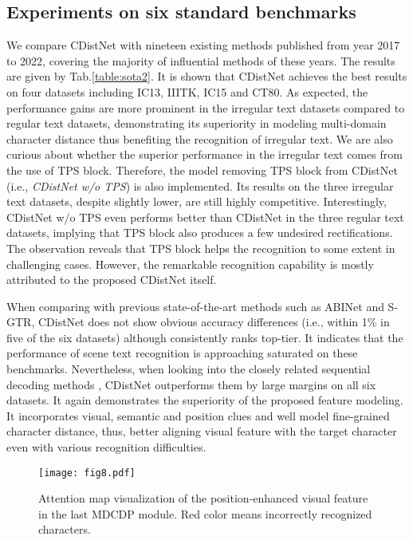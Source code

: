 \subsection{Experiments on six standard benchmarks}
We compare CDistNet with nineteen existing methods published from year 2017 to 2022, covering the majority of influential methods of these years. The results are given by Tab.\ref{table:sota2}. It is shown that CDistNet achieves the best results on four datasets including IC13, IIITK, IC15 and CT80. As expected, the performance gains are more prominent in the irregular text datasets compared to regular text datasets, demonstrating its superiority in modeling multi-domain character distance thus benefiting the recognition of irregular text. We are also curious about whether the superior performance in the irregular text comes from the use of TPS block. Therefore, the model removing TPS block from CDistNet (i.e., \emph{CDistNet w/o TPS}) is also implemented. Its results on the three irregular text datasets, despite slightly lower, are still highly competitive. Interestingly, CDistNet w/o TPS even performs better than CDistNet in the three regular text datasets, implying that TPS block also produces a few undesired rectifications. The observation reveals that TPS block helps the recognition to some extent in challenging cases. However, the remarkable recognition capability is mostly attributed to the proposed CDistNet itself.

When comparing with previous state-of-the-art methods such as ABINet and S-GTR, CDistNet does not show obvious accuracy differences (i.e., within 1\% in five of the six datasets) although consistently ranks top-tier. It indicates that the performance of scene text recognition is approaching saturated on these benchmarks. Nevertheless, when looking into the closely related sequential decoding methods \citep{sheng2019nrtr,wan2020textscanner,yue2020robustscanner}, CDistNet outperforms them by large margins on all six datasets. It again demonstrates the superiority of the proposed feature modeling. It incorporates visual, semantic and position clues and well model fine-grained character distance, thus, better aligning visual feature with the target character even with various recognition difficulties.

\begin{figure*}[ht]
\centering
\texttt{[image: fig8.pdf]} 
\caption{Attention map visualization of the position-enhanced visual feature in the last MDCDP module. Red color means incorrectly recognized characters.}
\label{fig:vis_case}
\end{figure*}


